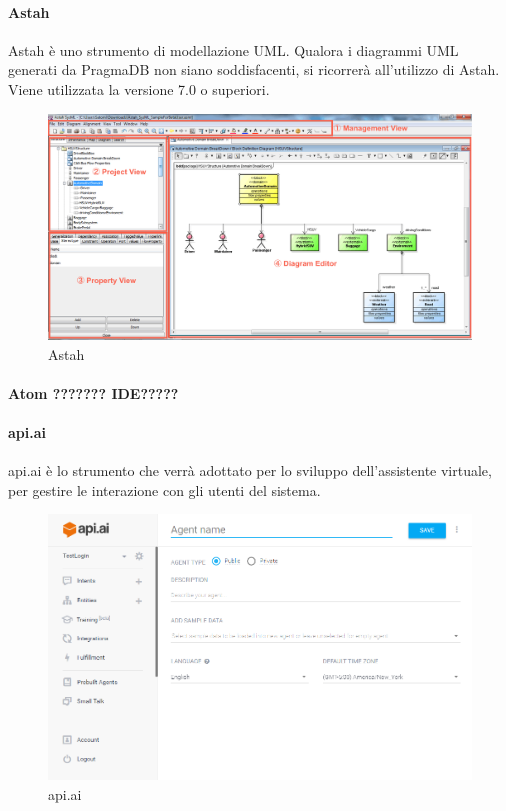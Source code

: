   \paragraph{Astah}
  Astah è uno strumento di modellazione UML. Qualora i diagrammi UML generati da PragmaDB non siano soddisfacenti, si ricorrerà all'utilizzo di Astah. Viene utilizzata la versione 7.0 o superiori.
\begin{figure}[h]
\centering
\includegraphics[scale=0.3]{img/astah.png}
\caption{Astah}\label{sec:Figura1}
\end{figure}

\paragraph{Atom ??????? IDE?????}

\paragraph{api.ai}
api.ai è lo strumento che verrà adottato per lo sviluppo dell'assistente virtuale, per gestire le interazione con gli utenti del sistema.
\begin{figure}[h]
\centering
\includegraphics[scale=0.5]{img/api_ai.png}
\caption{api.ai}\label{sec:Figura1}
\end{figure}

\newpage
